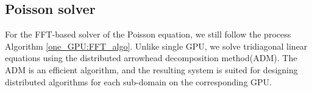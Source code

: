 \subsection{Poisson solver}\label{distribute Poisson}
For the FFT-based solver of the Poisson equation, we still follow the process Algorithm \ref{one_GPU:FFT_algo}. Unlike single GPU, we solve tridiagonal linear equations using the distributed arrowhead decomposition method(ADM)\cite{arrowhead2017}. The ADM is an efficient algorithm, and the resulting system is suited for designing distributed algorithms for each sub-domain on the corresponding GPU.

